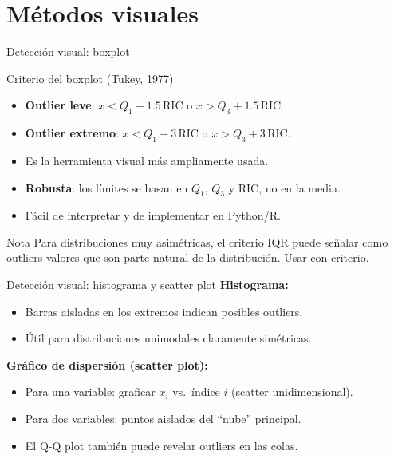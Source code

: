 \documentclass[aspectratio=169]{beamer}
\begin{document}
\section{Métodos visuales}

\begin{frame}{Detección visual: boxplot}
  \begin{block}{Criterio del boxplot (Tukey, 1977)}
    \begin{itemize}
      \item \textbf{Outlier leve}: $x < Q_1 - 1.5\,\text{RIC}$ \quad o \quad $x > Q_3 + 1.5\,\text{RIC}$.
      \item \textbf{Outlier extremo}: $x < Q_1 - 3\,\text{RIC}$ \quad o \quad $x > Q_3 + 3\,\text{RIC}$.
    \end{itemize}
  \end{block}
  \bigskip
  \begin{itemize}
    \item Es la herramienta visual más ampliamente usada.
    \item \textbf{Robusta}: los límites se basan en $Q_1$, $Q_3$ y RIC, no en la media.
    \item Fácil de interpretar y de implementar en Python/R.
  \end{itemize}
  \bigskip
  \begin{exampleblock}{Nota}
    Para distribuciones muy asimétricas, el criterio IQR puede señalar como outliers valores que son parte natural de la distribución. Usar con criterio.
  \end{exampleblock}
\end{frame}

\begin{frame}{Detección visual: histograma y scatter plot}
  \textbf{Histograma:}
  \begin{itemize}
    \item Barras aisladas en los extremos indican posibles outliers.
    \item Útil para distribuciones unimodales claramente simétricas.
  \end{itemize}
  \bigskip
  \textbf{Gráfico de dispersión (scatter plot):}
  \begin{itemize}
    \item Para una variable: graficar $x_i$ vs.\ índice $i$ (scatter unidimensional).
    \item Para dos variables: puntos aislados del ``nube'' principal.
    \item El Q-Q plot también puede revelar outliers en las colas.
  \end{itemize}
\end{frame}
\end{document}

